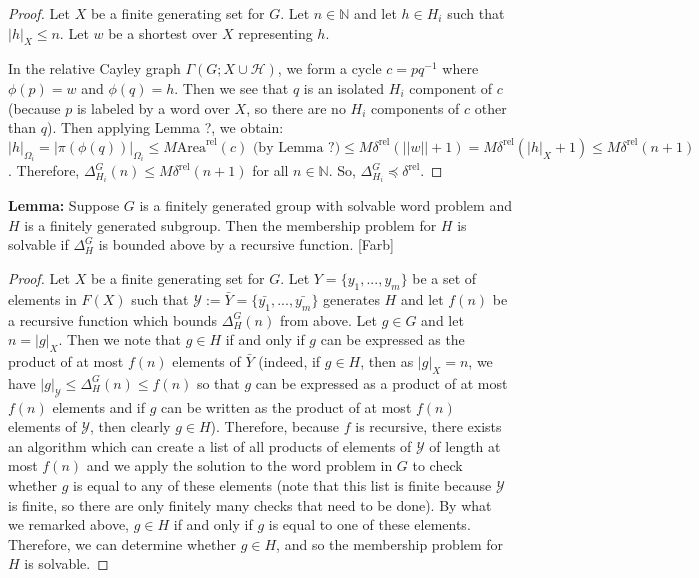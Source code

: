 \documentclass[12pt]{article}
\newcommand{\vs}{\vskip10pt}
\begin{document}
	\begin{proof}
		
		Let $X$ be a finite generating set for $G$. Let $n \in \mathbb{N}$ and let $h \in H_i$ such that $\vert h \vert_X \leq n$. Let $w$ be a shortest over $X$ representing $h$. 
		
		\vs 
		
		In the relative Cayley graph $\Gamma(G; X \cup \mathcal{H})$, we form a cycle $c = pq^{-1}$ where $\phi(p) = w$ and $\phi(q) = h$. Then we see that $q$ is an isolated $H_i$ component of $c$ (because $p$ is labeled by a word over $X$, so there are no  $H_i$ components of $c$ other than $q$). Then applying Lemma ?, we obtain: $\vert h \vert_{\Omega_i} = \vert \pi(\phi(q)) \vert_{\Omega_i} \leq M \text{Area}^{\text{rel}}(c) \text{ (by Lemma ?)} \leq M \delta^{\text{rel}}( \vert \vert w \vert \vert + 1) = M \delta^{\text{rel}}( \vert h \vert_X + 1) \leq M \delta^{\text{rel}}(n + 1)$. Therefore, $\Delta_{H_i}^G (n) \leq M \delta^{\text{rel}}(n + 1)$ for all $n \in \mathbb{N}$. So,  $\Delta_{H_i}^G \preccurlyeq \delta^{\text{rel}}$.
		
	\end{proof}

	\vs 
	
	\textbf{Lemma: } Suppose $G$ is a finitely generated group with solvable word problem and $H$ is a finitely generated subgroup. Then the membership problem for $H$ is solvable if $\Delta_H^G$ is bounded above by a recursive function. [Farb]
	
	\begin{proof}
		
		Let $X$ be a finite generating set for $G$. Let $Y = \{y_1,...,y_m\}$ be a set of elements in $F(X)$ such that $\mathcal{Y} := \bar{Y} = \{\bar{y_1},...,\bar{y_m}\}$ generates $H$ and let $f(n)$ be a recursive function which bounds $\Delta_H^G(n)$ from above. Let $g \in G$ and let $n = \vert g \vert_X$. Then we note that $g \in H$ if and only if $g$ can be expressed as the product of at most $f(n)$ elements of $\bar{Y}$ (indeed, if $g \in H$, then as $\vert g \vert_X = n$, we have $\vert g \vert_{\mathcal{Y}} \leq \Delta_H^G(n) \leq f(n)$ so that $g$ can be expressed as a product of at most $f(n)$ elements and if $g$ can be written as the product of at most $f(n)$ elements of $\mathcal{Y}$, then clearly $g \in H$). Therefore, because $f$ is recursive, there exists an algorithm which can create a list of all products of elements of $\mathcal{Y}$ of length at most $f(n)$ and we apply the solution to the word problem in $G$ to check whether $g$ is equal to any of these elements (note that this list is finite because $\mathcal{Y}$ is finite, so there are only finitely many checks that need to be done). By what we remarked above, $g \in H$ if and only if $g$ is equal to one of these elements. Therefore, we can determine whether $g \in H$, and so the membership problem for $H$ is solvable.
		
	\end{proof}
\end{document}
